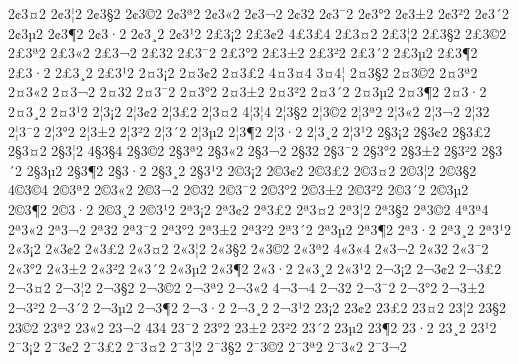 {2^^a23^^a42
2^^a23^^a62
2^^a23^^a72
2^^a23^^a92
2^^a23^^aa2
2^^a23^^ab2
2^^a23^^ac2
2^^a23^^ad2
2^^a23^^af2
2^^a23^^b02
2^^a23^^b12
2^^a23^^b22
2^^a23^^b42
2^^a23^^b52
2^^a23^^b62
2^^a23^^b72
2^^a23^^b82
2^^a23^^b92
2^^a33^^a12
2^^a33^^a22
4^^a33^^a34
2^^a33^^a42
2^^a33^^a62
2^^a33^^a72
2^^a33^^a92
2^^a33^^aa2
2^^a33^^ab2
2^^a33^^ac2
2^^a33^^ad2
2^^a33^^af2
2^^a33^^b02
2^^a33^^b12
2^^a33^^b22
2^^a33^^b42
2^^a33^^b52
2^^a33^^b62
2^^a33^^b72
2^^a33^^b82
2^^a33^^b92
2^^a43^^a12
2^^a43^^a22
2^^a43^^a32
4^^a43^^a44
3^^a44^^a6
2^^a43^^a72
2^^a43^^a92
2^^a43^^aa2
2^^a43^^ab2
2^^a43^^ac2
2^^a43^^ad2
2^^a43^^af2
2^^a43^^b02
2^^a43^^b12
2^^a43^^b22
2^^a43^^b42
2^^a43^^b52
2^^a43^^b62
2^^a43^^b72
2^^a43^^b82
2^^a43^^b92
2^^a63^^a12
2^^a63^^a22
2^^a63^^a32
2^^a63^^a42
4^^a63^^a64
2^^a63^^a72
2^^a63^^a92
2^^a63^^aa2
2^^a63^^ab2
2^^a63^^ac2
2^^a63^^ad2
2^^a63^^af2
2^^a63^^b02
2^^a63^^b12
2^^a63^^b22
2^^a63^^b42
2^^a63^^b52
2^^a63^^b62
2^^a63^^b72
2^^a63^^b82
2^^a63^^b92
2^^a73^^a12
2^^a73^^a22
2^^a73^^a32
2^^a73^^a42
2^^a73^^a62
4^^a73^^a74
2^^a73^^a92
2^^a73^^aa2
2^^a73^^ab2
2^^a73^^ac2
2^^a73^^ad2
2^^a73^^af2
2^^a73^^b02
2^^a73^^b12
2^^a73^^b22
2^^a73^^b42
2^^a73^^b52
2^^a73^^b62
2^^a73^^b72
2^^a73^^b82
2^^a73^^b92
2^^a93^^a12
2^^a93^^a22
2^^a93^^a32
2^^a93^^a42
2^^a93^^a62
2^^a93^^a72
4^^a93^^a94
2^^a93^^aa2
2^^a93^^ab2
2^^a93^^ac2
2^^a93^^ad2
2^^a93^^af2
2^^a93^^b02
2^^a93^^b12
2^^a93^^b22
2^^a93^^b42
2^^a93^^b52
2^^a93^^b62
2^^a93^^b72
2^^a93^^b82
2^^a93^^b92
2^^aa3^^a12
2^^aa3^^a22
2^^aa3^^a32
2^^aa3^^a42
2^^aa3^^a62
2^^aa3^^a72
2^^aa3^^a92
4^^aa3^^aa4
2^^aa3^^ab2
2^^aa3^^ac2
2^^aa3^^ad2
2^^aa3^^af2
2^^aa3^^b02
2^^aa3^^b12
2^^aa3^^b22
2^^aa3^^b42
2^^aa3^^b52
2^^aa3^^b62
2^^aa3^^b72
2^^aa3^^b82
2^^aa3^^b92
2^^ab3^^a12
2^^ab3^^a22
2^^ab3^^a32
2^^ab3^^a42
2^^ab3^^a62
2^^ab3^^a72
2^^ab3^^a92
2^^ab3^^aa2
4^^ab3^^ab4
2^^ab3^^ac2
2^^ab3^^ad2
2^^ab3^^af2
2^^ab3^^b02
2^^ab3^^b12
2^^ab3^^b22
2^^ab3^^b42
2^^ab3^^b52
2^^ab3^^b62
2^^ab3^^b72
2^^ab3^^b82
2^^ab3^^b92
2^^ac3^^a12
2^^ac3^^a22
2^^ac3^^a32
2^^ac3^^a42
2^^ac3^^a62
2^^ac3^^a72
2^^ac3^^a92
2^^ac3^^aa2
2^^ac3^^ab2
4^^ac3^^ac4
2^^ac3^^ad2
2^^ac3^^af2
2^^ac3^^b02
2^^ac3^^b12
2^^ac3^^b22
2^^ac3^^b42
2^^ac3^^b52
2^^ac3^^b62
2^^ac3^^b72
2^^ac3^^b82
2^^ac3^^b92
2^^ad3^^a12
2^^ad3^^a22
2^^ad3^^a32
2^^ad3^^a42
2^^ad3^^a62
2^^ad3^^a72
2^^ad3^^a92
2^^ad3^^aa2
2^^ad3^^ab2
2^^ad3^^ac2
4^^ad3^^ad4
2^^ad3^^af2
2^^ad3^^b02
2^^ad3^^b12
2^^ad3^^b22
2^^ad3^^b42
2^^ad3^^b52
2^^ad3^^b62
2^^ad3^^b72
2^^ad3^^b82
2^^ad3^^b92
2^^af3^^a12
2^^af3^^a22
2^^af3^^a32
2^^af3^^a42
2^^af3^^a62
2^^af3^^a72
2^^af3^^a92
2^^af3^^aa2
2^^af3^^ab2
2^^af3^^ac2
}
